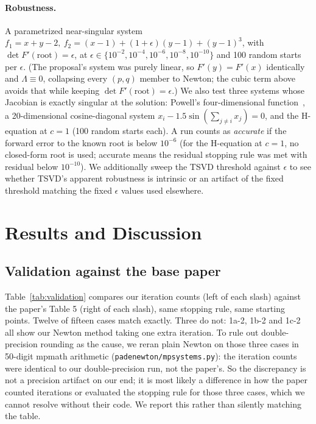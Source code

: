 \documentclass[sigconf,nonacm]{acmart}
\begin{document}
\paragraph{Robustness.} A parametrized near-singular system
$f_1=x+y-2,\ f_2=(x-1)+(1+\epsilon)(y-1)+(y-1)^3$, with $\det F'(\text{root})=\epsilon$, at
$\epsilon\in\{10^{-2},10^{-4},10^{-6},10^{-8},10^{-10}\}$ and 100 random starts per $\epsilon$.
(The proposal's system was purely linear, so $F'(y)=F'(x)$ identically and $\Lambda\equiv0$,
collapsing every $(p,q)$ member to Newton; the cubic term above avoids that while keeping
$\det F'(\text{root})=\epsilon$.) We also test three systems whose Jacobian is exactly singular
at the solution: Powell's four-dimensional function~\cite{powell1970}, a 20-dimensional
cosine-diagonal system $x_i-1.5\sin(\sum_{j\ne i}x_j)=0$, and the H-equation at $c=1$ (100 random
starts each). A run counts as \emph{accurate} if the forward error to the known root is below
$10^{-6}$ (for the H-equation at $c=1$, no closed-form root is used; accurate means the residual
stopping rule was met with residual below $10^{-10}$). We additionally sweep the TSVD threshold
against $\epsilon$ to see whether TSVD's apparent robustness is intrinsic or an artifact of the
fixed threshold matching the fixed $\epsilon$ values used elsewhere.

\section{Results and Discussion}

\subsection{Validation against the base paper}

Table~\ref{tab:validation} compares our iteration counts (left of each slash) against the
paper's Table 5 (right of each slash), same stopping rule, same starting points. Twelve of
fifteen cases match exactly. Three do not: 1a-2, 1b-2 and 1c-2 all show our Newton method taking
one extra iteration. To rule out double-precision rounding as the cause, we reran plain Newton
on those three cases in 50-digit mpmath arithmetic (\texttt{padenewton/mpsystems.py}): the
iteration counts were identical to our double-precision run, not the paper's. So the discrepancy
is not a precision artifact on our end; it is most likely a difference in how the paper counted
iterations or evaluated the stopping rule for those three cases, which we cannot resolve without
their code. We report this rather than silently matching the table.
\end{document}
